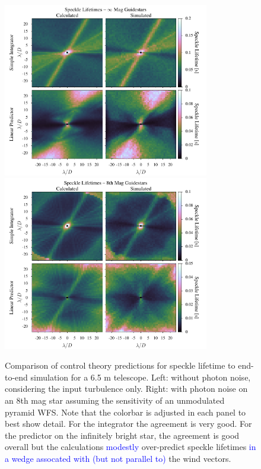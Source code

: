 \documentclass[10pt,preprint]{aastex631}
\newcommand{\jrmadd}[1]{\textcolor{blue}{#1}}
\begin{document}
\begin{figure}
\hspace{-0.3in}
\includegraphics[width=3.54in]{lifetimes0mag.pdf}
\includegraphics[width=3.54in]{lifetimes8mag.pdf}
\caption{Comparison of control theory predictions for speckle lifetime to end-to-end simulation for a 6.5 m telescope.  Left: without photon noise, considering the input turbulence only.  Right: with photon noise on an 8th mag star assuming the sensitivity of an unmodulated pyramid WFS. Note that the colorbar is adjusted in each panel to best show detail. For the integrator the agreement is very good.  For the predictor on the infinitely bright star, the agreement is good overall but the calculations \jrmadd{modestly} over-predict speckle lifetimes \jrmadd{in a wedge assocated with (but not parallel to)} the wind vectors.  \label{fig:lifetime_2Dcomp}}
\end{figure}
\end{document}
